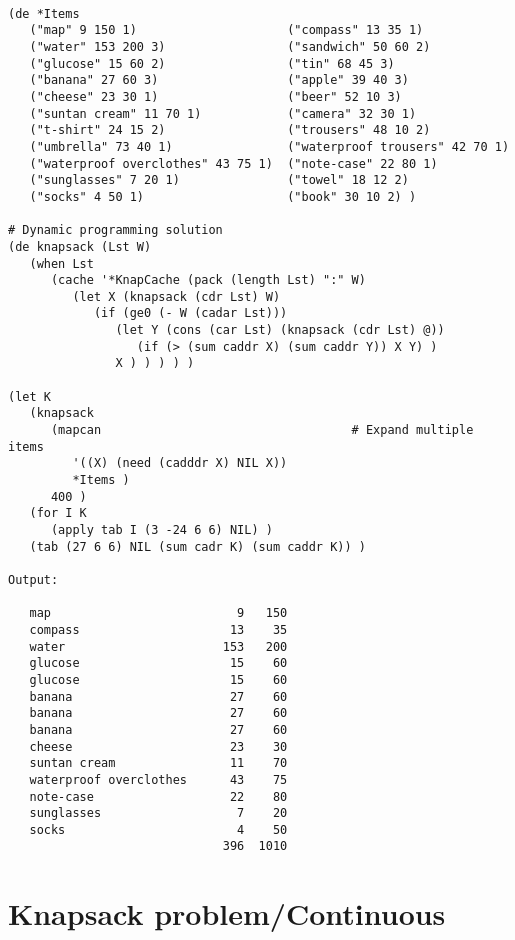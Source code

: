 \begin{verbatim}

(de *Items
   ("map" 9 150 1)                     ("compass" 13 35 1)
   ("water" 153 200 3)                 ("sandwich" 50 60 2)
   ("glucose" 15 60 2)                 ("tin" 68 45 3)
   ("banana" 27 60 3)                  ("apple" 39 40 3)
   ("cheese" 23 30 1)                  ("beer" 52 10 3)
   ("suntan cream" 11 70 1)            ("camera" 32 30 1)
   ("t-shirt" 24 15 2)                 ("trousers" 48 10 2)
   ("umbrella" 73 40 1)                ("waterproof trousers" 42 70 1)
   ("waterproof overclothes" 43 75 1)  ("note-case" 22 80 1)
   ("sunglasses" 7 20 1)               ("towel" 18 12 2)
   ("socks" 4 50 1)                    ("book" 30 10 2) )

# Dynamic programming solution
(de knapsack (Lst W)
   (when Lst
      (cache '*KnapCache (pack (length Lst) ":" W)
         (let X (knapsack (cdr Lst) W)
            (if (ge0 (- W (cadar Lst)))
               (let Y (cons (car Lst) (knapsack (cdr Lst) @))
                  (if (> (sum caddr X) (sum caddr Y)) X Y) )
               X ) ) ) ) )

(let K
   (knapsack
      (mapcan                                   # Expand multiple items
         '((X) (need (cadddr X) NIL X))
         *Items )
      400 )
   (for I K
      (apply tab I (3 -24 6 6) NIL) )
   (tab (27 6 6) NIL (sum cadr K) (sum caddr K)) )

Output:

   map                          9   150
   compass                     13    35
   water                      153   200
   glucose                     15    60
   glucose                     15    60
   banana                      27    60
   banana                      27    60
   banana                      27    60
   cheese                      23    30
   suntan cream                11    70
   waterproof overclothes      43    75
   note-case                   22    80
   sunglasses                   7    20
   socks                        4    50
                              396  1010

\end{verbatim}

\section*{Knapsack problem/Continuous}

